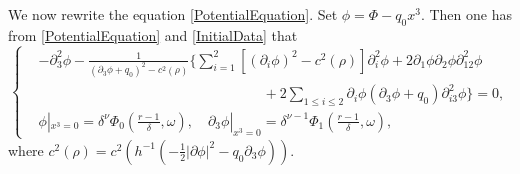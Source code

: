 \documentclass[11pt,twoside]{article}
\def\f{\frac}
\def\p{\partial}
\def\dps{\displaystyle}
\begin{document}
We now rewrite the equation \eqref{PotentialEquation}.
Set $\phi=\Phi-q_0x^3$. Then one has from \eqref{PotentialEquation} and \eqref{InitialData}  that
\begin{equation}\label{equationofphi}
\begin{cases}
&-\partial_3^2\phi
-\dps\f{1}{(\partial_3\phi+q_0)^2-c^2(\rho)}\bigg\{\dps\sum_{i=1}^2\left[(\partial_i \phi)^2-c^2(\rho)\right]\partial_i^2\phi+ 2\partial_1\phi\partial_2\phi\partial_{12}^2\phi\\
&\qquad \qquad \qquad \qquad \qquad \qquad \qquad \qquad +2\dps\sum_{1\leq i\leq 2}\partial_i\phi(\partial_3\phi
+q_0)\partial_{i3}^2\phi\bigg\} = 0, \\
&\phi|_{x^3=0}=\delta^{\nu}\Phi_0(\frac{r-1}{\delta},\omega), \quad
\partial_3\phi|_{x^3=0}=\delta^{\nu-1}\Phi_1(\frac{r-1}{\delta},\omega),
\end{cases}
\end{equation}
where $c^2(\rho)=c^2(h^{-1}(-\f12|\p\phi|^2-q_0\p_3\phi))$.
\end{document}
